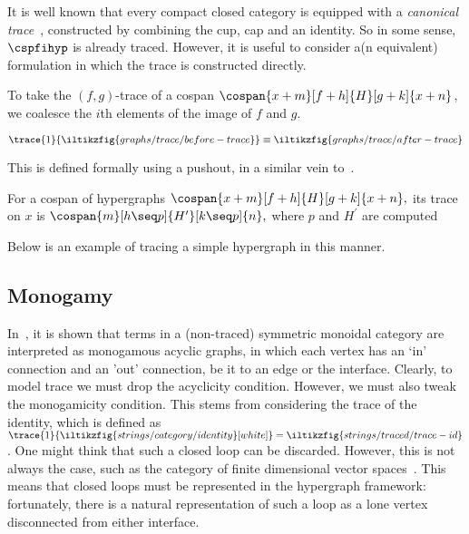 It is well known that every compact closed category is equipped with a
\emph{canonical trace}~\cite{joyal1996traced}, constructed by combining the cup,
cap and an identity.
So in some sense, \(\cspfihyp\) is already traced.
However, it is useful to consider a(n equivalent) formulation in which the trace
is constructed directly.

To take the \((f,g)\)-trace of a cospan \(\cospan{x+m}[f+h]{H}[g+k]{x+n}\), we
coalesce the \(i\)th elements of the image of \(f\) and \(g\).
\begin{center}
    \(
        \trace{1}{\iltikzfig{graphs/trace/before-trace}}
        \equiv
        \iltikzfig{graphs/trace/after-trace}
    \)
\end{center}
This is defined formally using a pushout, in a similar vein
to~\cite{dixon2013opengraphs}.

\begin{definition}
    For a cospan of hypergraphs \(
        \cospan{x+m}[f+h]{H}[g+k]{x+n},
    \) its trace on \(x\) is \(
        \cospan{m}[h \seq p]{H^\prime}[k \seq p]{n},
    \) where \(p\) and \(H^\prime\) are computed%
    \iftoggle{conf}{
        as the pushout of \(f + h\) and \([\id, \id]\).
    }{
        by the following pushout:
        \begin{center}
            \tikzfig{graphs/trace/trace-pushout}
        \end{center}
    }
\end{definition}

\begin{example}
    Below is an example of tracing a simple hypergraph in this manner.
    \begin{center}
    \end{center}
\end{example}

\subsection{Monogamy}

In~\cite{bonchi2016rewriting}, it is shown that terms in a (non-traced)
symmetric monoidal category are interpreted as monogamous acyclic graphs, in
which each vertex has an `in' connection and an 'out' connection, be it to an
edge or the interface.
Clearly, to model trace we must drop the acyclicity condition.
However, we must also tweak the monogamicity condition.
This stems from considering the trace of the identity, which is defined as
\(
    \trace{1}{\iltikzfig{strings/category/identity}[white]}
    =
    \iltikzfig{strings/traced/trace-id}
\).
One might think that such a closed loop can be discarded.
However, this is not always the case, such as the category of finite dimensional
vector spaces~\cite[Sec. 6.1]{hasegawa1997recursion}.
This means that closed loops must be represented in the hypergraph framework:
fortunately, there is a natural representation of such a loop as a lone vertex
disconnected from either interface.

